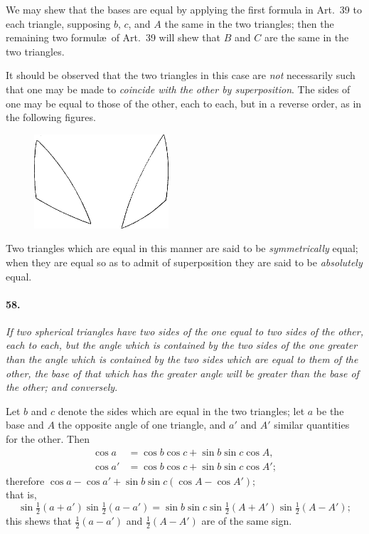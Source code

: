 \documentclass{book}[2004/02/16]
\begin{document}
\begin{mainmatter}
\begin{spacing}{1.3}
We may shew that the bases are equal by applying the first
formula in Art.~39 to each triangle, supposing $b$, $c$, and $A$ the
same in the two triangles; then the remaining two formul\ae\ of
Art.~39 will shew that $B$ and $C$ are the same in the two triangles.

It should be observed that the two triangles in this case are
\textit{not} necessarily such that one may be made to \textit{coincide with the
other by superposition}. The sides of one may be equal to those of
the other, each to each, but in a reverse order, as in the following
figures.
\begin{figure}[htp]
\centering
\includegraphics[width=5.0cm]{images/038fc}
\end{figure}

Two triangles which are equal in this manner are said to be
\textit{symmetrically} equal; when they are equal so as to admit of superposition
they are said to be \textit{absolutely} equal.

\paragraph{58.} \textit{If two spherical triangles have two sides of the one equal to
two sides of the other, each to each, but the angle which is contained
by the two sides of the one greater than the angle which is contained
by the two sides which are equal to them of the other, the base of that
which has the greater angle will be greater than the base of the
other; and conversely}.

Let $b$ and $c$ denote the sides which are equal in the two triangles;
let $a$ be the base and $A$ the opposite angle of one triangle,
and $a'$ and $A'$ similar quantities for the other. Then
\begin{align*}
  \cos a  &= \cos b \cos c + \sin b \sin c \cos A,\\
  \cos a' &= \cos b \cos c + \sin b \sin c \cos A';
\end{align*}
therefore \hfill
$\cos a - \cos a' + \sin b \sin c (\cos A - \cos A');$
\hfill\phantom{therefore}\\
that is,
\[
  \sin\tfrac{1}{2} (a + a')
  \sin\tfrac{1}{2} (a - a') =
  \sin b \sin c \sin\tfrac{1}{2} (A + A')
                \sin\tfrac{1}{2} (A - A');
\]
this shews that $\tfrac{1}{2} (a - a')$ and $\tfrac{1}{2} (A - A')$ are of the same sign.


\end{spacing}
\end{mainmatter}
\end{document}
